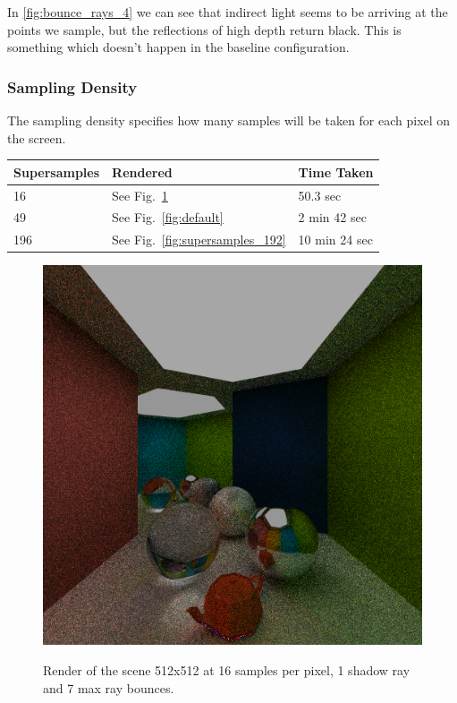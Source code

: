 \documentclass[a4paper, twocolumn]{article}
\begin{document}
            In \cref{fig:bounce_rays_4} we can see that indirect light seems to be arriving at the points we sample, but the reflections of high depth return black. This is something which doesn't happen in the baseline configuration.

            \vspace{-0.5em}

            \subsubsection*{Sampling Density}

            The sampling density specifies how many samples will be taken for each pixel on the screen.

            \begin{table}[H]
            \centering
            \begin{tabular}{lll}
                \toprule
                \textbf{Supersamples}&\textbf{Rendered}&\textbf{Time Taken}\\
                \midrule
                16&See Fig.~\ref{fig:supersamples_16}&50.3 sec\\
                49&See Fig.~\ref{fig:default}&2 min 42 sec\\
                196&See Fig.~\ref{fig:supersamples_192}&10 min 24 sec\\
                \bottomrule
            \end{tabular}
            \label{tab:supersamples}
            \end{table}

            \begin{figure}[H]
                \centering
                \caption{Render of the scene 512x512 at 16 samples per pixel, 1 shadow ray and 7 max ray bounces.}
                \includegraphics[width=0.8\linewidth]{share/results/supersamples_16.png}
                \label{fig:supersamples_16}
            \end{figure}
\end{document}

